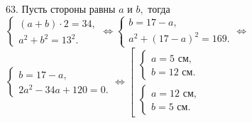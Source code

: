 63. Пусть стороны равны $a$ и $b,$ тогда $\begin{cases}(a+b)\cdot2=34,\\ a^2+b^2=13^2.\end{cases}\Leftrightarrow
\begin{cases}b=17-a,\\ a^2+(17-a)^2=169.\end{cases}\Leftrightarrow$\\$
\begin{cases}b=17-a,\\ 2a^2-34a+120=0.\end{cases}\Leftrightarrow
\left[\begin{array}{l}\begin{cases}a=5\text{ см},\\ b=12\text{ см}.\end{cases}\\ \begin{cases}a=12\text{ см},\\ b=5\text{ см}.\end{cases}\end{array}\right.$\\
